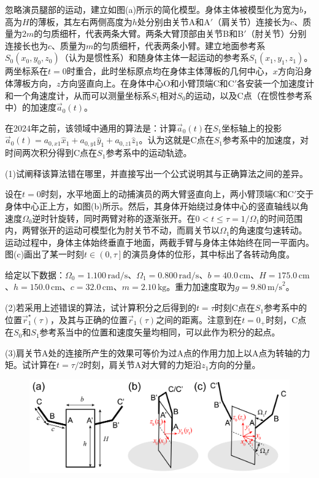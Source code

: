 \documentclass[11pt,a4paper,onecolumn,UTF8]{ctexart}
\begin{document}
	忽略演员腿部的运动，建立如图(a)所示的简化模型。身体主体被模型化为宽为$b$，高为$H$的薄板，其左右两侧高度为$h$处分别由关节A和A$'$（肩关节）连接长为$c$、质量为$2m$的匀质细杆，代表两条大臂。两条大臂顶部由关节B和B$'$（肘关节）分别连接长也为$c$、质量为$m$的匀质细杆，代表两条小臂。建立地面参考系$S_0(x_0,y_0,z_0)$（认为是惯性系）和随身体主体一起运动的参考系$S_1(x_1,y_1,z_1)$。两坐标系在$t=0$时重合，此时坐标原点均在身体主体薄板的几何中心，$x$方向沿身体薄板方向，$z$方向竖直向上。在身体中心O和小臂顶端C和C$'$各安装一个加速度计和一个角速度计，从而可以测量坐标系$S_1$相对$S_0$的运动，以及C点（在惯性参考系中）的加速度$\vec a_0(t)$。
	
	在2024年之前，该领域中通用的算法是：计算$\vec a_0(t)$在$S_1$坐标轴上的投影$\vec a_0(t)=a_{0,x1}\hat x_1+a_{0,y1}\hat y_1+a_{0,z1}\hat z_1$。认为这就是C点在$S_1$参考系中的加速度，对时间两次积分得到C点在$S_1$参考系中的运动轨迹。
	
	(1)试阐释该算法错在哪里，并直接写出一个公式说明其与正确算法之间的差异。
	
	设在$t=0$时刻，水平地面上的动捕演员的两大臂竖直向上，两小臂顶端C和C$'$交于身体中心正上方，如图(b)所示。然后，其身体开始绕过身体中心的竖直轴线以角速度$\Omega_0$逆时针旋转，同时两臂对称的逐渐张开。在$0<t\leq\tau=1/\Omega_1$的时间范围内，两臂张开的运动可模型化为肘关节不动，而肩关节以$\Omega_1$的角速度匀速转动。运动过程中，身体主体始终垂直于地面，两截手臂与身体主体始终在同一平面内。图(c)画出了某一时刻$t\in\left(0,\tau\right]$的演员身体的位形，其中标出了各转动角度。
	
	给定以下数据：$\Omega_0=1.100\,\text{rad/s}$、$\Omega_1=0.800\,\text{rad/s}$、$b=40.0\,\text{cm}$、$H=175.0\,\text{cm}$、$h=150.0\,\text{cm}$、$c=32.0\,\text{cm}$、$m=2.10\,\text{kg}$。重力加速度取为$g=9.80\,\text{m/s}^2$。
	
	(2)若采用上述错误的算法，试计算积分之后得到的$t=\tau$时刻C点在$S_1$参考系中的位置$\vec r_{1}^\star(\tau)$，及其与正确的位置$\vec r_1(\tau)$之间的距离。注意到在$t=0_+$时刻，C点在$S_0$和$S_1$参考系当中的位置和速度矢量均相同，可以此作为积分的起点。
	
	(3)肩关节A处的连接所产生的效果可等价为过A点的作用力加上以A点为转轴的力矩。试计算在$t=\tau/2$时刻，肩关节A对大臂的力矩沿$z_1$方向的分量。
	
	\begin{figure}[!bh]
		\centering
		\includegraphics[width=0.96\columnwidth]{4.png}
	\end{figure}
	
\end{document}
